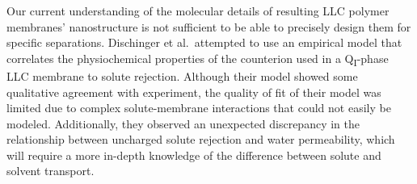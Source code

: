 
  Our current understanding of the molecular details of resulting LLC polymer membranes'
  nanostructure is not sufficient to be able to precisely design them for
  specific separations. Dischinger et al.~attempted to use an empirical model
  that correlates the physiochemical properties of the counterion used in a 
  Q\textsubscript{I}-phase LLC membrane to solute rejection\cite{dischinger_effect_2017}.
  Although their model showed some qualitative agreement with experiment, the
  quality of fit of their model was limited due to complex solute-membrane 
  interactions that could not easily be modeled. Additionally, they observed
  an unexpected discrepancy in the relationship between uncharged solute
  rejection and water permeability, which will require a more in-depth knowledge of
  the difference between solute and solvent transport.
  
